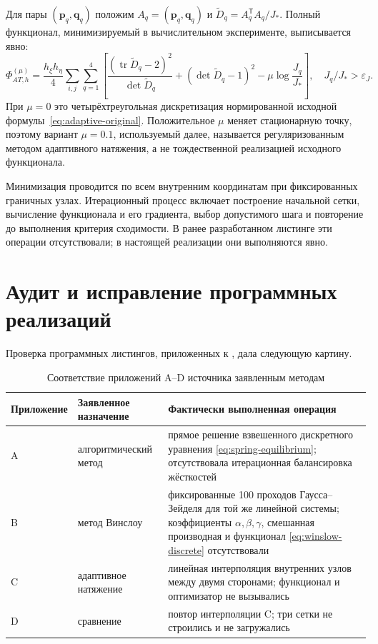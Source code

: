 \documentclass[11pt,a4paper]{article}
\newcommand{\vect}[1]{\boldsymbol{#1}}
\DeclareMathOperator{\tr}{tr}
\begin{document}
Для пары \((\vect p_q,\vect q_q)\) положим
\(A_q=(\vect p_q,\vect q_q)\) и
\(\widetilde D_q=A_q^{\mathsf T}A_q/J_*\). Полный функционал,
минимизируемый в вычислительном эксперименте, выписывается явно:
\begin{equation}
\Phi_{AT,h}^{(\mu)}
=\frac{h_\xi h_\eta}{4}
\sum_{i,j}\sum_{q=1}^{4}
\left[
\frac{(\tr\widetilde D_q-2)^2}{\det\widetilde D_q}
+(\det\widetilde D_q-1)^2
-\mu\log\frac{J_q}{J_*}
\right],
\quad J_q/J_*>\varepsilon_J.
\label{eq:adaptive-discrete}
\end{equation}
При \(\mu=0\) это четырёхтреугольная дискретизация нормированной исходной
формулы~\eqref{eq:adaptive-original}. Положительное \(\mu\) меняет
стационарную точку, поэтому вариант \(\mu=0.1\), используемый далее,
называется регуляризованным методом адаптивного натяжения, а не
тождественной реализацией исходного функционала.

Минимизация проводится по всем внутренним координатам при фиксированных
граничных узлах. Итерационный процесс включает построение начальной
сетки, вычисление функционала и его градиента, выбор допустимого шага и
повторение до выполнения критерия сходимости. В ранее разработанном
листинге \cite{khalilov2024} эти операции отсутствовали; в настоящей
реализации они выполняются явно.

\section{Аудит и исправление программных реализаций}

Проверка программных листингов, приложенных к
\cite{khalilov2024}, дала следующую картину.\par\medskip
\begin{table}[H]
\centering
\caption{Соответствие приложений A--D источника \cite{khalilov2024}
заявленным методам}
\label{tab:audit}
\small
\begin{tabular}{
>{\raggedright\arraybackslash}p{25mm}
>{\raggedright\arraybackslash}p{45mm}
>{\raggedright\arraybackslash}p{82mm}}
\toprule
Приложение & Заявленное назначение & Фактически выполненная операция \\
\midrule
A & алгоритмический метод &
прямое решение взвешенного дискретного уравнения
\eqref{eq:spring-equilibrium}; отсутствовала итерационная балансировка
жёсткостей \\
B & метод Винслоу &
фиксированные 100 проходов Гаусса--Зейделя для той же линейной системы;
коэффициенты \(\alpha,\beta,\gamma\), смешанная производная и функционал
\eqref{eq:winslow-discrete} отсутствовали \\
C & адаптивное натяжение &
линейная интерполяция внутренних узлов между двумя сторонами;
функционал и оптимизатор не вызывались \\
D & сравнение &
повтор интерполяции C; три сетки не строились и не загружались \\
\bottomrule
\end{tabular}
\end{table}
\end{document}
